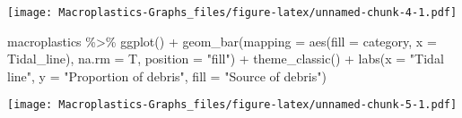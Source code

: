 \documentclass[
]{article}
\newenvironment{Shaded}{\begin{snugshade}}{\end{snugshade}}
\newcommand{\AttributeTok}[1]{\textcolor[rgb]{0.77,0.63,0.00}{#1}}
\newcommand{\FunctionTok}[1]{\textcolor[rgb]{0.00,0.00,0.00}{#1}}
\newcommand{\NormalTok}[1]{#1}
\newcommand{\OtherTok}[1]{\textcolor[rgb]{0.56,0.35,0.01}{#1}}
\newcommand{\SpecialCharTok}[1]{\textcolor[rgb]{0.00,0.00,0.00}{#1}}
\newcommand{\StringTok}[1]{\textcolor[rgb]{0.31,0.60,0.02}{#1}}
\begin{document}
\begin{Shaded}
\end{Shaded}

\texttt{[image: Macroplastics-Graphs\_files/figure-latex/unnamed-chunk-4-1.pdf]}

\begin{Shaded}
\begin{Highlighting}[]
\NormalTok{macroplastics }\SpecialCharTok{\%\textgreater{}\%} 
  \FunctionTok{ggplot}\NormalTok{() }\SpecialCharTok{+}
  \FunctionTok{geom\_bar}\NormalTok{(}\AttributeTok{mapping =} \FunctionTok{aes}\NormalTok{(}\AttributeTok{fill =}\NormalTok{ category, }\AttributeTok{x =}\NormalTok{ Tidal\_line), }\AttributeTok{na.rm =}\NormalTok{ T, }\AttributeTok{position =} \StringTok{"fill"}\NormalTok{) }\SpecialCharTok{+}
  \FunctionTok{theme\_classic}\NormalTok{() }\SpecialCharTok{+}
  \FunctionTok{labs}\NormalTok{(}\AttributeTok{x =} \StringTok{"Tidal line"}\NormalTok{, }\AttributeTok{y =} \StringTok{"Proportion of debris"}\NormalTok{, }\AttributeTok{fill =} \StringTok{"Source of debris"}\NormalTok{)}
\end{Highlighting}
\end{Shaded}

\texttt{[image: Macroplastics-Graphs\_files/figure-latex/unnamed-chunk-5-1.pdf]}
\end{document}
